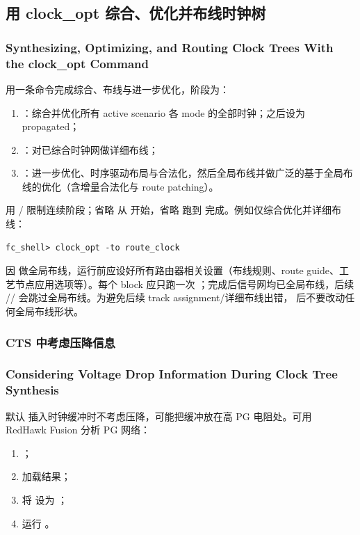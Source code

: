 \subsection{用 clock\_opt 综合、优化并布线时钟树}
\subsubsection*{Synthesizing, Optimizing, and Routing Clock Trees With the clock\_opt Command}

 用一条命令完成综合、布线与进一步优化，阶段为：
\begin{enumerate}
  \item {}：综合并优化所有 active scenario 各 mode 的全部时钟；之后设为 propagated；
  \item {}：对已综合时钟网做详细布线；
  \item {}：进一步优化、时序驱动布局与合法化，然后全局布线并做广泛的基于全局布线的优化（含增量合法化与 route patching）。
\end{enumerate}
用 / 限制连续阶段；省略  从  开始，省略  跑到  完成。例如仅综合优化并详细布线：
\begin{lstlisting}
fc_shell> clock_opt -to route_clock
\end{lstlisting}

因  做全局布线，运行前应设好所有路由器相关设置（布线规则、route guide、工艺节点应用选项等）。每个 block 应只跑一次 ；完成后信号网均已全局布线，后续 // 会跳过全局布线。为避免后续 track assignment/详细布线出错， 后不要改动任何全局布线形状。

\subsubsection{CTS 中考虑压降信息}
\subsubsection*{Considering Voltage Drop Information During Clock Tree Synthesis}

默认  插入时钟缓冲时不考虑压降，可能把缓冲放在高 PG 电阻处。可用 RedHawk Fusion 分析 PG 网络：
\begin{enumerate}
  \item {}；
  \item {} 加载结果；
  \item 将  设为 ；
  \item 运行 。
\end{enumerate}

